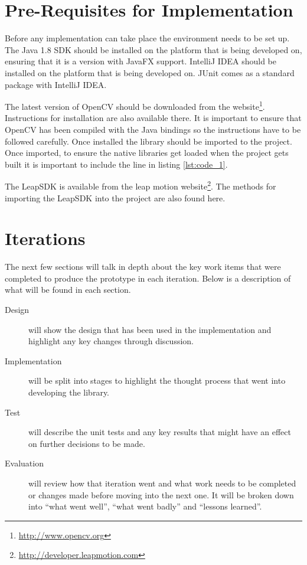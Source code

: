 \documentclass[11pt,oneside]{report}
\begin{document}
	\section{Pre-Requisites for Implementation}
		Before any implementation can take place the environment needs to be set up.
		The Java 1.8 SDK should be installed on the platform that is being developed on, ensuring that it is a version with JavaFX support.
		IntelliJ IDEA should be installed on the platform that is being developed on.
		JUnit comes as a standard package with IntelliJ IDEA.
		
		The latest version of OpenCV should be downloaded from the website\footnote{\url{http://www.opencv.org}}.
		Instructions for installation are also available there.
		It is important to ensure that OpenCV has been compiled with the Java bindings so the instructions have to be followed carefully.
		Once installed the library should be imported to the project. %
		Once imported, to ensure the native libraries get loaded when the project gets built it is important to include the line in listing \ref{lst:code_1}.
		
				
		The LeapSDK is available from the leap motion website\footnote{\url{http://developer.leapmotion.com}}.
		The methods for importing the LeapSDK into the project are also found here.
	\section{Iterations}
		The next few sections will talk in depth about the key work items that were completed to produce the prototype in each iteration.
		Below is a description of what will be found in each section.
		\begin{description}
		\item[Design] will show the design that has been used in the implementation and highlight any key changes through discussion.
		\item[Implementation] will be split into stages to highlight the thought process that went into developing the library.
		\item[Test] will describe the unit tests and any key results that might have an effect on further decisions to be made.
		\item[Evaluation] will review how that iteration went and what work needs to be completed or changes made before moving into the next one. It will be broken down into ``what went well'', ``what went badly'' and ``lessons learned''.
		\end{description}
\end{document}
